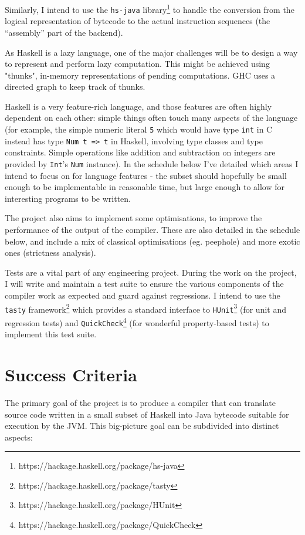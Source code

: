 \documentclass[12pt]{article}
\newcommand\haskell[1]{\texttt{#1}}
\newcommand\monospace[1]{\texttt{#1}}
\begin{document}
Similarly, I intend to use the \monospace{hs-java} library\footnote{https://hackage.haskell.org/package/hs-java} to
handle the conversion from the logical representation of bytecode to the actual instruction sequences (the ``assembly''
part of the backend).

As Haskell is a lazy language, one of the major challenges will be to design a way to represent and perform lazy
computation. This might be achieved using "thunks", in-memory representations of pending computations. GHC uses a
directed graph to keep track of thunks.

Haskell is a very feature-rich language, and those features are often highly dependent on each other: simple things
often touch many aspects of the language (for example, the simple numeric literal \haskell{5} which would have type
\texttt{int} in C instead has type \haskell{Num t => t} in Haskell, involving type classes and type constraints.
Simple operations like addition and subtraction on integers are provided by \haskell{Int}'s \haskell{Num} instance). In
the schedule below I've detailed which areas I intend to focus on for language features - the subset should hopefully be
small enough to be implementable in reasonable time, but large enough to allow for interesting programs to be written.

The project also aims to implement some optimisations, to improve the performance of the output of the compiler. These
are also detailed in the schedule below, and include a mix of classical optimisations (eg. peephole) and more exotic
ones (strictness analysis).

Tests are a vital part of any engineering project. During the work on the project, I will write and maintain a test suite
to ensure the various components of the compiler work as expected and guard against regressions. I intend to use the
\monospace{tasty} framework\footnote{https://hackage.haskell.org/package/tasty} which provides a standard interface to
\monospace{HUnit}\footnote{https://hackage.haskell.org/package/HUnit} (for unit and regression tests) and
\monospace{QuickCheck}\footnote{https://hackage.haskell.org/package/QuickCheck} (for wonderful property-based tests) to
implement this test suite.


\section*{Success Criteria}

The primary goal of the project is to produce a compiler that can translate source code written in a small subset of
Haskell into Java bytecode suitable for execution by the JVM. This big-picture goal can be subdivided into distinct
aspects:
\end{document}
